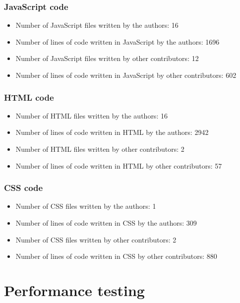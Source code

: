 \documentclass{eplmastersthesis}
\begin{document}
\subsubsection{JavaScript code}

\begin{itemize}
\item Number of JavaScript files written by the authors: 16
\item Number of lines of code written in JavaScript by the authors: 1696
\item Number of JavaScript files written by other contributors: 12
\item Number of lines of code written in JavaScript by other contributors: 602
\end{itemize}

\subsubsection{HTML code}

\begin{itemize}
\item Number of HTML files written by the authors: 16
\item Number of lines of code written in HTML by the authors: 2942
\item Number of HTML files written by other contributors: 2
\item Number of lines of code written in HTML by other contributors: 57
\end{itemize}

\subsubsection{CSS code}

\begin{itemize}
\item Number of CSS files written by the authors: 1
\item Number of lines of code written in CSS by the authors: 309
\item Number of CSS files written by other contributors: 2
\item Number of lines of code written in CSS by other contributors: 880
\end{itemize}

\section{Performance testing}
\end{document}
